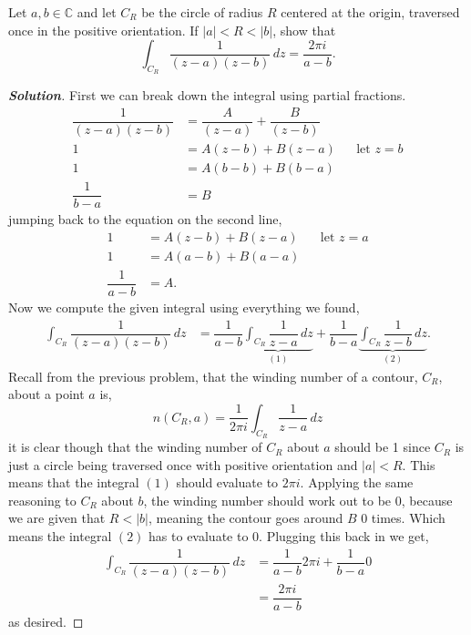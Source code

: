 \documentclass[11pt]{article}
\newenvironment{problem}[2][Problem\!]{\begin{trivlist}
\item[\hskip \labelsep {\bfseries #1}\hskip \labelsep {\bfseries #2}]}{\end{trivlist}}
\newenvironment{solution}{\begin{proof}[\textbf{\textit{Solution}}] }{\end{proof}}
\newcommand{\cc}{\mathbb C}   %
\newcommand{\abs}[1]{\left\lvert#1\right\rvert} %
\begin{document}
\begin{problem}{7.4}
Let $a,b \in \cc$ and let $C_R$ be the circle of radius $R$ centered at the origin, traversed once in the positive orientation. If $\abs{a} < R < \abs{b}$, show that
\[\int_{C_R} \frac{1}{(z-a)(z-b)}\, dz = \frac{2\pi i}{a-b}.\]
\end{problem}
\begin{solution}
  First we can break down the integral using partial fractions. 
  \begin{align*}
    \dfrac{1}{(z-a)(z-b)} &= \dfrac{A}{(z-a)}+ \dfrac{B}{(z-b)} \\
    1 &= A(z-b) + B(z-a) && \text{let $z = b$} \\
    1&= A(b-b) + B(b-a) \\
    \dfrac{1}{b -a} &= B
  \end{align*}
  jumping back to the equation on the second line, 
  \begin{align*}
    1 &= A(z-b) + B(z-a) && \text{let $z = a$} \\
    1 &= A(a -b) + B(a - a) \\
    \dfrac{1}{a-b} &= A.
  \end{align*}
  Now we compute the given integral using everything we found,
  \begin{align*}
    \int_{C_R}\dfrac{1}{(z-a)(z-b)}\, d z &= \dfrac{1}{a-b}\underbrace{\int_{C_R}\dfrac{1}{z-a}\, dz}_{(1)} + \dfrac{1}{b-a}\underbrace{\int_{C_R}\dfrac{1}{z-b}\, dz}_{(2)} .
  \end{align*}
  Recall from the previous problem, that the winding number of a contour, $C_R$, about a point $a$ is,
  \[n(C_R, a) = \dfrac{1}{2\pi i}\int_{C_R}\dfrac{1}{z-a}\, d z\]
  it is clear though that the winding number of $C_R$ about $a$ should be 1 since $C_R$ is just a circle being traversed once with positive orientation and $\abs{a}< R$. This means that the integral $(1)$ should evaluate to $2\pi i$. Applying the same reasoning to $C_R$ about $b$, the winding number should work out to be 0, because we are given that $R < \abs{b}$, meaning the contour goes around $B$ 0 times. Which means the integral $(2)$ has to evaluate to $0$. Plugging this back in we get,
  \begin{align*}
    \int_{C_R}\dfrac{1}{(z-a)(z-b)}\, d z &= \dfrac{1}{a-b}2\pi i + \dfrac{1}{b-a} 0 \\
    &= \dfrac{2\pi i}{a-b}
  \end{align*}
  as desired. 
\end{solution}
\end{document}
